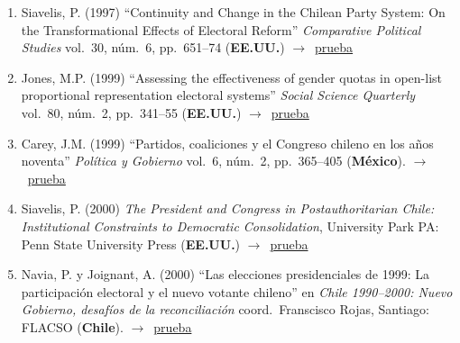 \documentclass[12 pt, letter]{article}
\newenvironment{CitasMiTrabajo}{
    \begin{footnotesize}
    \begin{enumerate}[label={\footnotesize\emph{cita~\arabic*}},ref=\arabic*] %
        \setlength{\itemsep}{.1\itemsep}
        \setlength{\parskip}{.1\parskip}
    }{\end{enumerate}\end{footnotesize}}
\begin{document}

        \begin{CitasMiTrabajo}

        \item Siavelis, P. (1997)
        ``Continuity and Change in the Chilean Party System: On the Transformational Effects of Electoral
        Reform''
        \emph{Comparative Political Studies} vol.\ 30, n\'um.\ 6, pp.\ 651--74
        (\textbf{EE.UU.}) $\rightarrow$~\href{http://ericmagar.com/cv/cites/mrs/siavelis97.pdf}{prueba}

        \item Jones, M.P. (1999) ``Assessing the effectiveness of
        gender quotas in open-list proportional representation electoral
        systems'' \emph{Social Science Quarterly} vol.\ 80, n\'um.\ 2, pp.\ 341--55
        (\textbf{EE.UU.}) $\rightarrow$~\href{http://ericmagar.com/cv/cites/mrs/jonesSSQ99.pdf}{prueba}

        \item Carey, J.M. (1999)
        ``Partidos, coaliciones y el Congreso chileno en los a\~nos noventa''
        \emph{Pol\'itica y Gobierno}
        vol.\ 6, n\'um.\ 2, pp.\ 365--405   (\textbf{M\'exico}). $\rightarrow$~\href{http://ericmagar.com/cv/cites/mrs/careyPartCongChile1999pyg.excerpt.pdf}{prueba}

        \item Siavelis, P. (2000) \emph{The President and Congress in
        Postauthoritarian Chile: Institutional Constraints to Democratic
        Consolidation}, University Park PA: Penn State University Press
        (\textbf{EE.UU.}) $\rightarrow$~\href{http://ericmagar.com/cv/cites/mrs/siavelisPdtCongPostAutChi.pdf}{prueba}

        \item Navia, P. y Joignant, A. (2000)
        ``Las elecciones presidenciales de 1999:
        La participaci\'on electoral y el nuevo votante chileno'' en \emph{Chile 1990--2000:
        Nuevo Gobierno, desaf\'ios de la reconciliaci\'on} coord.\ Franscisco Rojas,
        Santiago: FLACSO (\textbf{Chile}). $\rightarrow$~\href{http://ericmagar.com/cv/cites/mrs/naviaJoignantFlacso.pdf}{prueba}


\end{CitasMiTrabajo}
\end{document}

